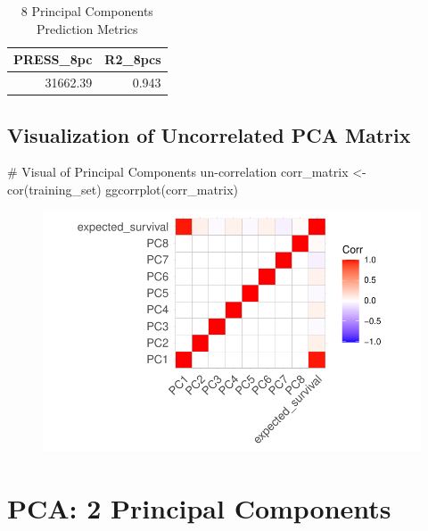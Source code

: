 \documentclass[
  letterpaper,
  DIV=11,
  numbers=noendperiod]{scrreprt}
\newenvironment{Shaded}{\begin{snugshade}}{\end{snugshade}}
\newcommand{\CommentTok}[1]{\textcolor[rgb]{0.37,0.37,0.37}{#1}}
\newcommand{\FunctionTok}[1]{\textcolor[rgb]{0.28,0.35,0.67}{#1}}
\newcommand{\NormalTok}[1]{\textcolor[rgb]{0.00,0.23,0.31}{#1}}
\newcommand{\OtherTok}[1]{\textcolor[rgb]{0.00,0.23,0.31}{#1}}
\begin{document}
\begin{table}

\caption{8 Principal Components Prediction Metrics}
\centering
\begin{tabular}[t]{r|r}
\hline
PRESS\_8pc & R2\_8pcs\\
\hline
31662.39 & 0.943\\
\hline
\end{tabular}
\end{table}

\hypertarget{visualization-of-uncorrelated-pca-matrix}{%
\subsection{Visualization of Uncorrelated PCA
Matrix}\label{visualization-of-uncorrelated-pca-matrix}}

\begin{Shaded}
\begin{Highlighting}[]
\CommentTok{\# Visual of Principal Components un{-}correlation}
\NormalTok{corr\_matrix }\OtherTok{\textless{}{-}} \FunctionTok{cor}\NormalTok{(training\_set)}
\FunctionTok{ggcorrplot}\NormalTok{(corr\_matrix)}
\end{Highlighting}
\end{Shaded}

\begin{figure}[H]

{\centering \includegraphics{analysis_files/figure-pdf/unnamed-chunk-30-1.pdf}

}

\end{figure}

\hypertarget{pca-2-principal-components}{%
\section{PCA: 2 Principal Components}\label{pca-2-principal-components}}
\end{document}
